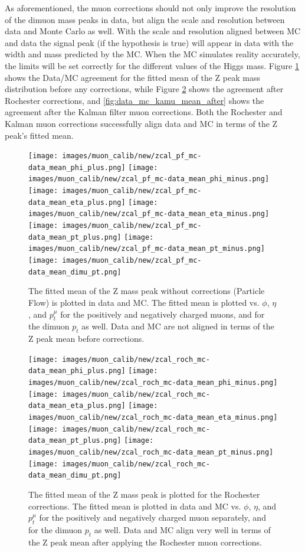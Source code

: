 As aforementioned, the muon corrections should not only improve the resolution of the dimuon mass peaks in data, but align the scale and resolution between data and Monte Carlo as well. With the scale and resolution aligned between MC and data the signal peak (if the hypothesis is true) will appear in data with the width and mass predicted by the MC. When the MC simulates reality accurately, the limits will be set correctly for the different values of the Higgs mass. Figure \ref{fig:data_mc_mean_before} shows the Data/MC agreement for the fitted mean of the Z peak mass distribution before any corrections, while Figure \ref{fig:data_mc_roch_mean_after} shows the agreement after Rochester corrections, and \ref{fig:data_mc_kamu_mean_after} shows the agreement after the Kalman filter muon corrections. Both the Rochester and Kalman muon corrections successfully align data and MC in terms of the Z peak's fitted mean.
\begin{figure}[!h]
  \centering
  \texttt{[image: images/muon\_calib/new/zcal\_pf\_mc-data\_mean\_phi\_plus.png]}
  \texttt{[image: images/muon\_calib/new/zcal\_pf\_mc-data\_mean\_phi\_minus.png]}
  \texttt{[image: images/muon\_calib/new/zcal\_pf\_mc-data\_mean\_eta\_plus.png]}
  \texttt{[image: images/muon\_calib/new/zcal\_pf\_mc-data\_mean\_eta\_minus.png]}
  \texttt{[image: images/muon\_calib/new/zcal\_pf\_mc-data\_mean\_pt\_plus.png]}
  \texttt{[image: images/muon\_calib/new/zcal\_pf\_mc-data\_mean\_pt\_minus.png]}
  \texttt{[image: images/muon\_calib/new/zcal\_pf\_mc-data\_mean\_dimu\_pt.png]}
  \caption[The mean of the Z mass peak and its alignment in data and MC before corrections.]
   {The fitted mean of the Z mass peak without corrections (Particle Flow) is plotted in data and MC. The fitted mean is plotted vs. $\phi$, $\eta$, and $p_t^\mu$ for the positively and negatively charged muons, and for the dimuon $p_t$ as well. Data and MC are not aligned in terms of the Z peak mean before corrections.}
  \label{fig:data_mc_mean_before}
\end{figure}

\begin{figure}[!h]
  \centering
  \texttt{[image: images/muon\_calib/new/zcal\_roch\_mc-data\_mean\_phi\_plus.png]}
  \texttt{[image: images/muon\_calib/new/zcal\_roch\_mc-data\_mean\_phi\_minus.png]}
  \texttt{[image: images/muon\_calib/new/zcal\_roch\_mc-data\_mean\_eta\_plus.png]}
  \texttt{[image: images/muon\_calib/new/zcal\_roch\_mc-data\_mean\_eta\_minus.png]}
  \texttt{[image: images/muon\_calib/new/zcal\_roch\_mc-data\_mean\_pt\_plus.png]}
  \texttt{[image: images/muon\_calib/new/zcal\_roch\_mc-data\_mean\_pt\_minus.png]}
  \texttt{[image: images/muon\_calib/new/zcal\_roch\_mc-data\_mean\_dimu\_pt.png]}
  \caption[The Z mass peak mean and its alignment in data and MC after Rochester corrections.]
   {The fitted mean of the Z mass peak is plotted for the Rochester corrections. The fitted mean is plotted in data and MC vs. $\phi$, $\eta$, and $p_t^\mu$ for the positively and negatively charged muon separately, and for the dimuon $p_t$ as well. Data and MC align very well in terms of the Z peak mean after applying the Rochester muon corrections.}
  \label{fig:data_mc_roch_mean_after}
\end{figure}

